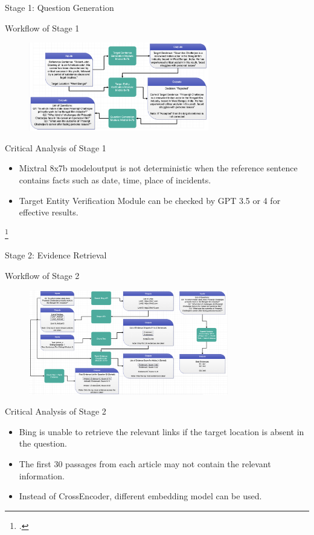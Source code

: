 \documentclass{beamer}
\begin{document}
	\begin{frame}{Stage 1: Question Generation}
		\begin{block}{\scriptsize Workflow of Stage 1}\scriptsize
			\begin{figure}
				\centering
				\includegraphics[width=0.7\textwidth]{module123.png}
			\end{figure}
		\end{block}
		\begin{block}{\scriptsize Critical Analysis of Stage 1}\scriptsize
			\begin{itemize}
				\item Mixtral 8x7b model\footnotemark output is not deterministic when the reference sentence contains facts such as date, time, place of incidents.
				\item Target Entity Verification Module can be checked by GPT 3.5 or 4 for effective results.
			\end{itemize}
		\end{block}
		\footcitetext{jiang2024mixtral}
	\end{frame}
	
	\begin{frame}{Stage 2: Evidence Retrieval}
		\begin{block}{\scriptsize Workflow of Stage 2}\scriptsize
			\begin{figure}
				\centering
				\includegraphics[width=0.775\textwidth]{module4.png}
			\end{figure}
		\end{block}
		\begin{block}{\scriptsize Critical Analysis of Stage 2}\scriptsize
			\begin{itemize}
				\item Bing is unable to retrieve the relevant links if the target location is absent in the question.
				\item The first 30 passages from each article may not contain the relevant information.
				\item Instead of CrossEncoder, different embedding model can be used.
			\end{itemize}
		\end{block}
	\end{frame}
	
\end{document}
